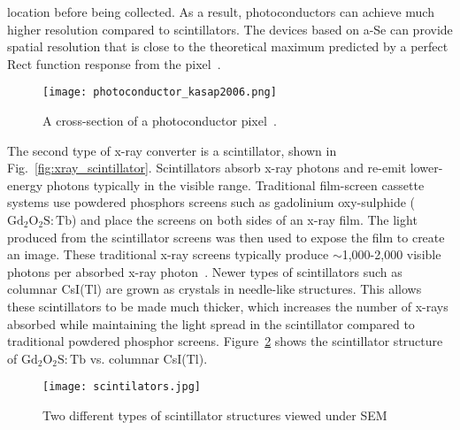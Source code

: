 location before being collected.  As a result, photoconductors can achieve much higher resolution compared to scintillators.  The devices based on a-Se can provide spatial resolution that is close to the theoretical maximum predicted by a perfect Rect function response from the pixel~\citep{hunt5030}. 

\begin{figure}[ht]
\centering
\texttt{[image: photoconductor\_kasap2006.png]}
\caption{A cross-section of a photoconductor pixel~\citep{kasap2006}.}
\label{fig:photoconductor_cross_section}
\end{figure}

The second type of x-ray converter is a scintillator, shown in Fig.~\ref{fig:xray_scintillator}.  Scintillators absorb x-ray photons and re-emit lower-energy photons typically in the visible range.  Traditional film-screen cassette systems use powdered phosphors screens such as gadolinium oxy-sulphide ($\mathrm{Gd_2O_2S \colon Tb}$) and place the screens on both sides of an x-ray film.  The light produced from the scintillator screens was then used to expose the film to create an image.  These traditional x-ray screens typically produce $\sim$1,000-2,000 visible photons per absorbed x-ray photon~\citep{trauernicht1988, trauernicht1990}. Newer types of scintillators such as columnar CsI(Tl) are grown as crystals in needle-like structures.  This allows these scintillators to be made much thicker, which increases the number of x-rays absorbed while maintaining the light spread in the scintillator compared to traditional powdered phosphor screens.  Figure~\ref{fig:scintillators} shows the scintillator structure of $\mathrm{Gd_2O_2S:Tb}$ vs. columnar CsI(Tl).

\begin{figure}[ht]
\texttt{[image: scintilators.jpg]}
\caption{Two different types of scintillator structures viewed under SEM~\citep{scintillatorImage}}
\label{fig:scintillators}
\end{figure}



